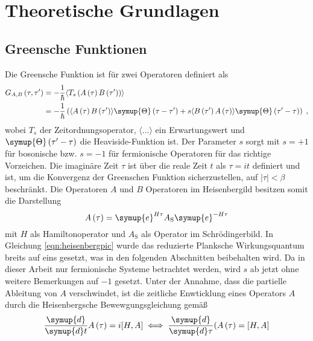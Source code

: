 \chapter{Theoretische Grundlagen}
\label{chap:theoretische_grundlagen}
\section{Greensche Funktionen}
Die Greensche Funktion ist für zwei Operatoren definiert als 
\begin{align}
    G_{A,B} \left (\tau, \tau' \right ) &= - \frac{1}{\hbar} \langle T_s \left ( A \left (\tau \right ) B \left ( \tau' \right ) \right ) \rangle \\
    & = - \frac{1}{\hbar} \left(  \langle A \left (\tau \right ) B \left ( \tau' \right ) \rangle \symup{\Theta} \left ( \tau - \tau' \right) + s 
    \langle B \left ( \tau' \right ) A \left (\tau \right ) \rangle \symup{\Theta} \left ( \tau' - \tau \right)  \right ) \; \text{,} \label{eqn:greensfunction}
\end{align}
wobei $T_s$ der Zeitordnungsoperator, $\langle \ldots \rangle$ ein Erwartungswert und $\symup{\Theta} \left ( \tau' - \tau \right)$ die Heaviside-Funktion ist.\cite{anders-fkt}\cite{uhrig-fktzwei}
Der Parameter $s$ sorgt mit $s=+1$ für bosonische bzw. $s=-1$ für fermionische Operatoren für das richtige Vorzeichen.
Die imaginäre Zeit $\tau$ ist über die reale Zeit $t$ als $\tau = it$ definiert und ist, um die Konvergenz der Greenschen Funktion sicherzustellen, 
auf $|\tau| < \beta$ beschränkt. \cite{anders-fkt}
Die Operatoren $A$ und $B$ Operatoren im Heisenbergild besitzen somit die Darstellung 
\begin{equation}
    A \left ( \tau \right ) = \symup{e}^{H \tau} A_\text{S} \symup{e}^{-H \tau} \label{eqn:heisenbergpic}
\end{equation}
mit $H$ als Hamiltonoperator und $A_\text{S}$ als Operator im Schrödingerbild. 
In Gleichung \eqref{eqn:heisenbergpic} wurde das reduzierte Planksche Wirkungsquantum breits auf eins gesetzt, was in den folgenden Abschnitten beibehalten wird.
Da in dieser Arbeit nur fermionische Systeme betrachtet werden, wird $s$ ab jetzt ohne weitere Bemerkungen auf $-1$ gesetzt.
Unter der Annahme, dass die partielle Ableitung von $A$ verschwindet, ist die zeitliche Enwticklung eines Operators 
$A$ durch die Heisenbergsche Bewewgungsgleichung gemäß 
\begin{equation}
\frac{\symup{d}}{\symup{d}t} A \left (\tau \right ) = i  [H, A] \iff \frac{\symup{d}}{\symup{d}\tau} ( A \left (\tau \right ) = [H, A] \label{eqn:heisenbergeom}
\end{equation}

